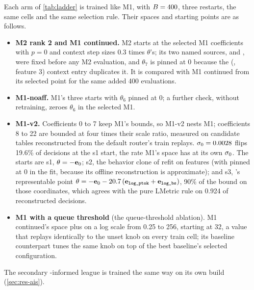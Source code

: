 Each arm of \cref{tab:ladder} is trained like M1, with $B = 400$, three restarts, the same
cells and the same selection rule. Their spaces and starting points are as follows.
\begin{itemize}
  \item \textbf{M2 rank 2 and M1 continued.} M2 starts at the selected M1 coefficients with $p = 0$
    and context step sizes 0.3 times $\theta$'s; its two named sources,  and
    , were fixed before any M2 evaluation, and $\theta_7$ is
    pinned at 0 because the (, feature 3) context entry duplicates it. It is compared
    with M1 continued from its selected point for the same added 400 evaluations.
  \item \textbf{M1-noaff.} M1's three starts with $\theta_6$ pinned at 0; a further check, without
    retraining, zeroes $\theta_6$ in the selected M1.
  \item \textbf{M1-v2.} Coefficients 0 to 7 keep M1's bounds, so M1-v2 nests M1; coefficients 8 to
    22 are bounded at four times their scale ratio, measured on candidate tables reconstructed from
    the default router's train replays. $\sigma_{0} = 0.0028$ flips 19.6\% of decisions at the s1
    start, the rate M1's space has at its own $\sigma_{0}$. The starts are s1, $\theta = -\mathbf{e}_{0}$;
    s2, the behavior clone of  refit on  features (with
     pinned at 0 in the fit, because its offline reconstruction is approximate);
    and s3, 's representable point
    $\theta = -\basis{0} - 20.7\,(\basis{\text{\code{log\_ptok}}} + \basis{\text{\code{log\_bs}}})$,
    90\% of the bound on those coordinates, which agrees with the pure LMetric rule on 0.924 of
    reconstructed decisions.
  \item \textbf{M1 with a queue threshold} (the queue-threshold ablation). M1 continued's space
    plus  on a log scale from 0.25 to 256, starting at 32, a value
    that replays identically to the unset knob on every train cell; its baseline counterpart tunes
    the same knob on top of the best baseline's selected configuration.
\end{itemize}
The secondary \ais{}-informed league is trained the same way on its own build (\cref{sec:res-ais}).

